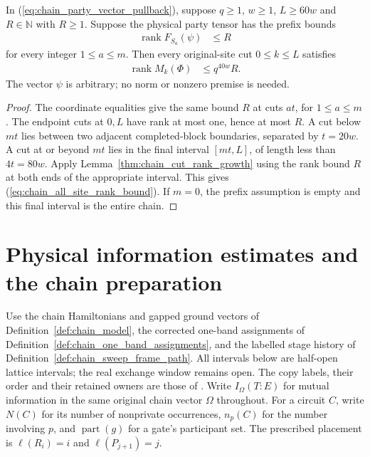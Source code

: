 \begin{lemma}
    \label{thm:chain_site_ranks_of_party_prefixes}
    \leanok
    In (\ref{eq:chain_party_vector_pullback}), suppose $q\ge1$, $w\ge1$,
    $L\ge60w$ and $R\in\mathbb N$ with $R\ge1$. Suppose the
    physical party tensor has the prefix bounds
    \begin{align}
        \operatorname{rank}F_{S_a}(\psi) & \le R
        \label{eq:chain_physical_prefix_hypothesis}
    \end{align}
    for every integer $1\le a\le m$. Then every original-site cut
    $0\le k\le L$ satisfies
    \begin{align}
        \operatorname{rank}M_k(\Phi) & \le q^{40w}R.
        \label{eq:chain_all_site_rank_bound}
    \end{align}
    The vector $\psi$ is arbitrary; no norm or nonzero premise is needed.
\end{lemma}
\begin{proof}\leanok
    The coordinate equalities give the same bound $R$ at cuts $at$,
    for $1\le a\le m$. The endpoint cuts at $0,L$ have rank at most
    one, hence at most $R$. A cut below $mt$ lies between two adjacent
    completed-block boundaries, separated by $t=20w$. A cut at or beyond
    $mt$ lies in the final interval $[mt,L]$, of length less than
    $4t=80w$. Apply Lemma~\ref{thm:chain_cut_rank_growth} using the
    rank bound $R$ at both ends of the appropriate interval. This gives
    (\ref{eq:chain_all_site_rank_bound}). If $m=0$, the prefix assumption
    is empty and this final interval is the entire chain.
\end{proof}

\section{Physical information estimates and the chain preparation}

Use the chain Hamiltonians and gapped ground vectors of
Definition~\ref{def:chain_model}, the corrected one-band assignments of
Definition~\ref{def:chain_one_band_assignments}, and the labelled stage
history of Definition~\ref{def:chain_sweep_frame_path}.
All intervals below are half-open lattice intervals; the real exchange
window remains open. The copy labels, their order and their retained
owners are those of
\cite{gap:tnlean_one_dimensional_band_sweep_corrections}.
Write $I_\Omega(T:E)$ for mutual information in the same original
chain vector $\Omega$ throughout. For a circuit $C$, write $N(C)$ for
its number of nonprivate occurrences, $n_p(C)$ for the number involving
$p$, and $\operatorname{part}(g)$ for a gate's participant set.
The prescribed placement is $\ell(R_i)=i$ and $\ell(P_{j+1})=j$.

